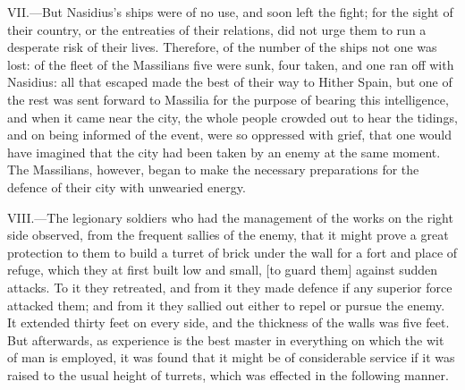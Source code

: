 VII.—But Nasidius's ships were of no use, and soon left the fight; for
the sight of their country, or the entreaties of their relations, did
not urge them to run a desperate risk of their lives. Therefore, of the
number of the ships not one was lost: of the fleet of the Massilians
five were sunk, four taken, and one ran off with Nasidius: all that
escaped made the best of their way to Hither Spain, but one of the rest
was sent forward to Massilia for the purpose of bearing this
intelligence, and when it came near the city, the whole people crowded
out to hear the tidings, and on being informed of the event, were so
oppressed with grief, that one would have imagined that the city had
been taken by an enemy at the same moment. The Massilians, however,
began to make the necessary preparations for the defence of their city
with unwearied energy.

VIII.—The legionary soldiers who had the management of the works on the
right side observed, from the frequent sallies of the enemy, that it
might prove a great protection to them to build a turret of brick under
the wall for a fort and place of refuge, which they at first built low
and small, [to guard them] against sudden attacks. To it they retreated,
and from it they made defence if any superior force attacked them; and
from it they sallied out either to repel or pursue the enemy. It
extended thirty feet on every side, and the thickness of the walls was
five feet. But afterwards, as experience is the best master in
everything on which the wit of man is employed, it was found that it
might be of considerable service if it was raised to the usual height of
turrets, which was effected in the following manner.

